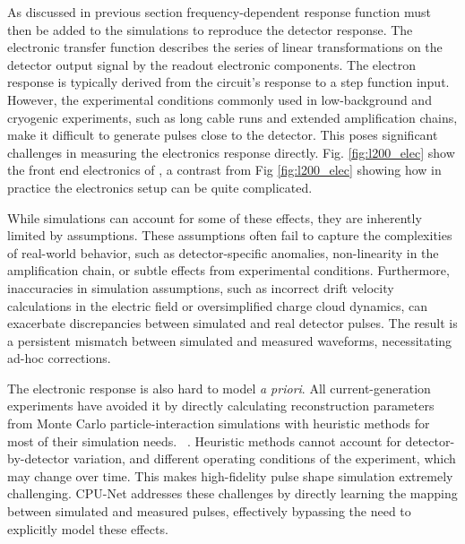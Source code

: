 

As discussed in previous section frequency-dependent response function must then be added to the simulations to reproduce the detector response. The electronic transfer function describes the series of linear transformations on the detector output signal by the readout electronic components. The electron response is typically derived from the circuit's response to a step function input. However, the experimental conditions commonly used in low-background and cryogenic experiments, such as long cable runs and extended amplification chains, make it difficult to generate pulses close to the detector. This poses significant challenges in measuring the electronics response directly. Fig. \ref{fig:l200_elec} show the front end electronics of {\Ltwo}, a contrast from Fig \ref{fig:l200_elec} showing how in practice the electronics setup can be quite complicated.

While simulations can account for some of these effects, they are inherently limited by assumptions. These assumptions often fail to capture the complexities of real-world behavior, such as detector-specific anomalies, non-linearity in the amplification chain, or subtle effects from experimental conditions. Furthermore, inaccuracies in simulation assumptions, such as incorrect drift velocity calculations in the electric field or oversimplified charge cloud dynamics, can exacerbate discrepancies between simulated and real detector pulses. The result is a persistent mismatch between simulated and measured waveforms, necessitating ad-hoc corrections. 

The electronic response is also hard to model \textit{a priori}. All current-generation experiments have avoided it by directly calculating reconstruction parameters from Monte Carlo particle-interaction simulations with heuristic methods for most of their simulation needs. ~\cite{Ben_Thesis,Sam_Thesis}. Heuristic methods cannot account for detector-by-detector variation, and different operating conditions of the experiment, which may change over time. This makes high-fidelity pulse shape simulation extremely challenging. CPU-Net addresses these challenges by directly learning the mapping between simulated and measured pulses, effectively bypassing the need to explicitly model these effects.

